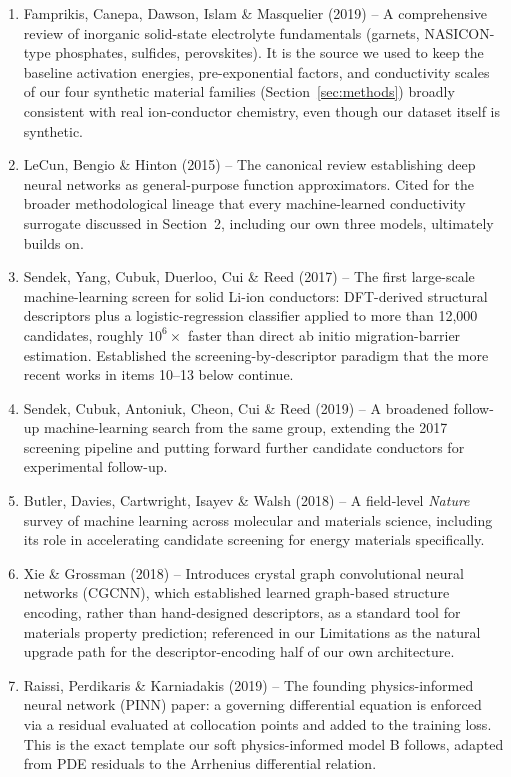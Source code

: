 \documentclass[11pt]{article}
\begin{document}
\begin{enumerate}
\item Famprikis, Canepa, Dawson, Islam \& Masquelier (2019) -- A comprehensive review of inorganic solid-state electrolyte fundamentals (garnets, NASICON-type phosphates, sulfides, perovskites). It is the source we used to keep the baseline activation energies, pre-exponential factors, and conductivity scales of our four synthetic material families (Section~\ref{sec:methods}) broadly consistent with real ion-conductor chemistry, even though our dataset itself is synthetic.
\item LeCun, Bengio \& Hinton (2015) -- The canonical review establishing deep neural networks as general-purpose function approximators. Cited for the broader methodological lineage that every machine-learned conductivity surrogate discussed in Section~2, including our own three models, ultimately builds on.
\item Sendek, Yang, Cubuk, Duerloo, Cui \& Reed (2017) -- The first large-scale machine-learning screen for solid Li-ion conductors: DFT-derived structural descriptors plus a logistic-regression classifier applied to more than 12{,}000 candidates, roughly $10^6\times$ faster than direct ab initio migration-barrier estimation. Established the screening-by-descriptor paradigm that the more recent works in items 10--13 below continue.
\item Sendek, Cubuk, Antoniuk, Cheon, Cui \& Reed (2019) -- A broadened follow-up machine-learning search from the same group, extending the 2017 screening pipeline and putting forward further candidate conductors for experimental follow-up.
\item Butler, Davies, Cartwright, Isayev \& Walsh (2018) -- A field-level \emph{Nature} survey of machine learning across molecular and materials science, including its role in accelerating candidate screening for energy materials specifically.
\item Xie \& Grossman (2018) -- Introduces crystal graph convolutional neural networks (CGCNN), which established learned graph-based structure encoding, rather than hand-designed descriptors, as a standard tool for materials property prediction; referenced in our Limitations as the natural upgrade path for the descriptor-encoding half of our own architecture.
\item Raissi, Perdikaris \& Karniadakis (2019) -- The founding physics-informed neural network (PINN) paper: a governing differential equation is enforced via a residual evaluated at collocation points and added to the training loss. This is the exact template our soft physics-informed model B follows, adapted from PDE residuals to the Arrhenius differential relation.

\end{enumerate}
\end{document}
